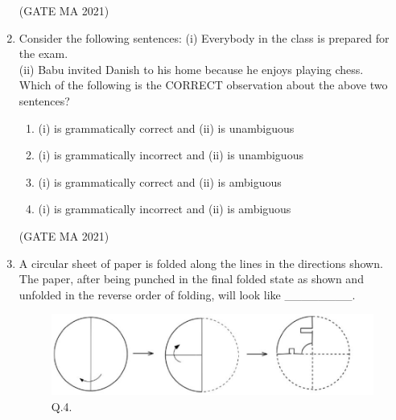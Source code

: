 \documentclass[journal,12pt,onecolumn]{IEEEtran}
\theoremstyle{remark}
\begin{document}
\begin{enumerate}
\hfill(GATE MA 2021)
    \item Consider the following sentences:
    (i) Everybody in the class is prepared for the exam.\\
    (ii) Babu invited Danish to his home because he enjoys playing chess.\\
    Which of the following is the CORRECT observation about the above two sentences?
    \begin{enumerate}
        \item (i) is grammatically correct and (ii) is unambiguous
        \item (i) is grammatically incorrect and (ii) is unambiguous
        \item (i) is grammatically correct and (ii) is ambiguous
        \item (i) is grammatically incorrect and (ii) is ambiguous
    \end{enumerate}
\hfill(GATE MA 2021)
    \item A circular sheet of paper is folded along the lines in the directions shown. The paper, after being punched in the final folded state as shown and unfolded in the reverse order of folding, will look like \_\_\_\_\_\_\_\_.
    \begin{figure}[H]
        \centering
        \includegraphics[width=0.5\linewidth]{figs/Q4.png}
        \caption{Q.4.}
        \label{fig:placeholder_4}
    \end{figure}
    \begin{enumerate}
\end{enumerate}
\end{enumerate}
\end{document}
